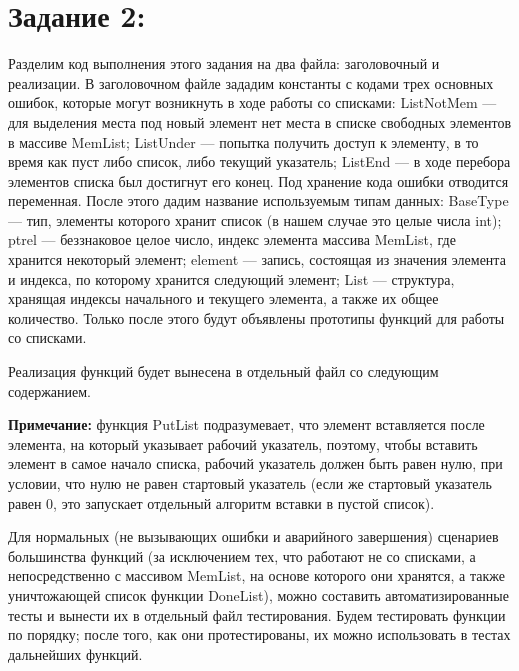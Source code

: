 \documentclass[12pt]{article}
\begin{document}
{	\section{Задание 2:}
	\label{task_2}
	
	Разделим код выполнения этого задания на два файла: заголовочный и  реализации. В заголовочном файле зададим константы с кодами трех основных ошибок, которые могут возникнуть в ходе работы со списками: ListNotMem --- для выделения места под новый элемент нет места в списке свободных элементов в массиве MemList; ListUnder --- попытка получить доступ к элементу, в то время как пуст либо список, либо текущий указатель; ListEnd --- в ходе перебора элементов списка был достигнут его конец. Под хранение кода ошибки отводится переменная. После этого дадим название используемым типам данных: BaseType --- тип, элементы которого хранит список (в нашем случае это целые числа int); ptrel --- беззнаковое целое число, индекс элемента массива MemList, где хранится некоторый элемент; element --- запись, состоящая из значения элемента и индекса, по которому хранится следующий элемент; List --- структура, хранящая индексы начального и текущего элемента, а также их общее количество. Только после этого будут объявлены прототипы функций для работы со списками. 
	
	 
	
	Реализация функций будет вынесена в отдельный файл со следующим содержанием.
	
	{\bf Примечание:} функция PutList подразумевает, что элемент вставляется после элемента, на который указывает рабочий указатель, поэтому, чтобы вставить элемент в самое начало списка, рабочий указатель должен быть равен нулю, при условии, что нулю не равен стартовый указатель (если же стартовый указатель равен 0, это запускает отдельный алгоритм вставки в пустой список).
	
	 

	Для нормальных (не вызывающих ошибки и аварийного завершения) сценариев большинства функций (за исключением тех, что работают не со списками, а непосредственно с массивом MemList, на основе которого они хранятся, а также уничтожающей список функции DoneList), можно составить автоматизированные тесты и вынести их в отдельный файл тестирования. Будем тестировать функции по порядку; после того, как они протестированы, их можно использовать в тестах дальнейших функций.
	
}
\end{document}
